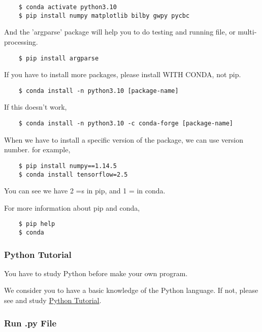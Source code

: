 \begin{verbatim}
    $ conda activate python3.10
    $ pip install numpy matplotlib bilby gwpy pycbc
\end{verbatim}

And the 'argparse' package will help you to do testing and running file, or multi-processing.

\begin{verbatim}
    $ pip install argparse
\end{verbatim}

If you have to install more packages, please install WITH CONDA, not pip.

\begin{verbatim}
    $ conda install -n python3.10 [package-name]
\end{verbatim}

If this doesn't work,

\begin{verbatim}
    $ conda install -n python3.10 -c conda-forge [package-name]
\end{verbatim}

When we have to install a specific version of the package, we can use version number. for example, 

\begin{verbatim}
    $ pip install numpy==1.14.5
    $ conda install tensorflow=2.5
\end{verbatim}

You can see we have 2 =s in pip, and 1 = in conda.

For more information about pip and conda,

\begin{verbatim}
    $ pip help
    $ conda
\end{verbatim}

\subsubsection{Python Tutorial}

You have to study Python before make your own program.

We consider you to have a basic knowledge of the Python language. If not, please see and study  \href{https://docs.python.org/3/tutorial/index.html}{Python Tutorial}.

\subsubsection{Run .py File}

